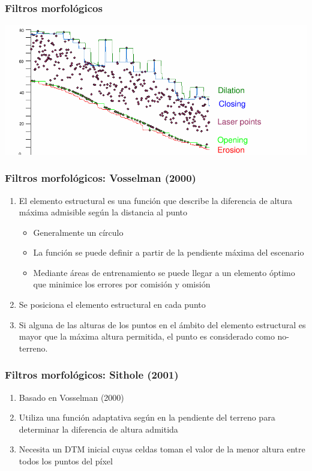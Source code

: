 \begin{frame}
  \frametitle{Filtros morfológicos}
  \begin{center}
    \includegraphics[height=0.70\textheight]{images/morfologia}
  \end{center}
\end{frame}
\begin{frame}
  \frametitle{Filtros morfológicos: Vosselman (2000)}
  \begin{enumerate}
    \item El elemento estructural es una función que describe la diferencia de
      altura máxima admisible según la distancia al punto
      \begin{itemize}
        \item Generalmente un círculo
        \item La función se puede definir a partir de la pendiente máxima del
          escenario
        \item Mediante áreas de entrenamiento se puede llegar a un elemento
          óptimo que minimice los errores por comisión y omisión
      \end{itemize}
    \item Se posiciona el elemento estructural en cada punto 
    \item Si alguna de las alturas de los puntos en el ámbito del elemento 
      estructural es mayor que la máxima altura permitida, el punto es 
      considerado como no-terreno.
  \end{enumerate}
\end{frame}
\begin{frame}
  \frametitle{Filtros morfológicos: Sithole (2001)}
  \begin{enumerate}
    \item Basado en Vosselman (2000)
    \item Utiliza una función adaptativa según en la pendiente del terreno 
      para determinar la diferencia de altura admitida
    \item Necesita un DTM inicial cuyas celdas toman el valor de la menor altura
      entre todos los puntos del píxel
  \end{enumerate}
\end{frame}
